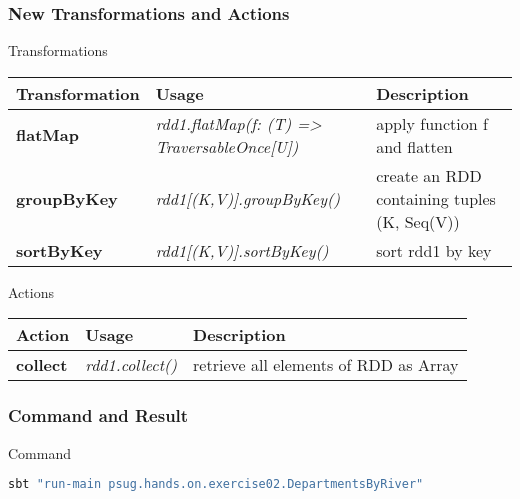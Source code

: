 \documentclass[slidetop,9pt,utf8]{beamer}
\begin{document}
\begin{CJK}{UTF8}{gbsn}
\begin{frame}[fragile]
\end{frame}

\begin{frame}

  \frametitle{New Transformations and Actions}

  \begin{block}{Transformations}
    \begin{center}
      \begin{tabular}{|m{2.1cm}|m{3.5cm}|m{5cm}|}
        \hline 
        \rowcolor{gray} \textbf{Transformation} & \textbf{Usage} & \textbf{Description} \\ \hline
        \textbf{flatMap} & \textit{rdd1.flatMap(f: (T) =\textgreater\xspace TraversableOnce[U])} & apply function f and flatten \\ \hline
        \textbf{groupByKey} & \textit{rdd1[(K,V)].groupByKey()} & create an RDD containing tuples (K, Seq(V)) \\ \hline
        \textbf{sortByKey} & \textit{rdd1[(K,V)].sortByKey()} & sort rdd1 by key \\ \hline
      \end{tabular}
    \end{center}
  \end{block}

  \begin{block}{Actions}
    \begin{center}
      \begin{tabular}{|m{2.1cm}|m{3.5cm}|m{5cm}|}
        \hline 
        \rowcolor{gray} \textbf{Action} & \textbf{Usage} & \textbf{Description} \\ \hline
        \textbf{collect} & \textit{rdd1.collect()} & retrieve all elements of RDD as Array \\ \hline
      \end{tabular}
    \end{center}
  \end{block}

\end{frame}

\begin{frame}[fragile]
  \frametitle{Command and Result}

  \begin{block}{Command}
    \begin{lstlisting}[language=bash, style=terminal]
sbt "run-main psug.hands.on.exercise02.DepartmentsByRiver"
    \end{lstlisting}
  \end{block}


\end{frame}
\end{CJK}
\end{document}
